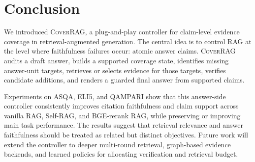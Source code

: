 \section{Conclusion}
\label{sec:conclusion}

We introduced \textsc{CoverRAG}, a plug-and-play controller for claim-level evidence coverage in retrieval-augmented generation. The central idea is to control RAG at the level where faithfulness failures occur: atomic answer claims. \textsc{CoverRAG} audits a draft answer, builds a supported coverage state, identifies missing answer-unit targets, retrieves or selects evidence for those targets, verifies candidate additions, and renders a guarded final answer from supported claims.

Experiments on ASQA, ELI5, and QAMPARI show that this answer-side controller consistently improves citation faithfulness and claim support across vanilla RAG, Self-RAG, and BGE-rerank RAG, while preserving or improving main task performance. The results suggest that retrieval relevance and answer faithfulness should be treated as related but distinct objectives. Future work will extend the controller to deeper multi-round retrieval, graph-based evidence backends, and learned policies for allocating verification and retrieval budget.

